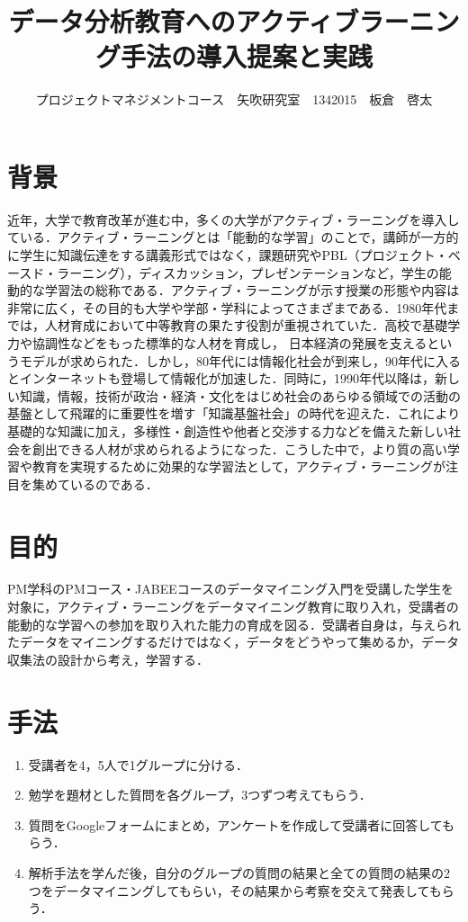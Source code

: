 \documentclass[uplatex,twocolumn,dvipdfmx]{jsarticle}
\title{\vspace{-5mm}\fontsize{14pt}{0pt}\selectfont  データ分析教育へのアクティブラーニング手法の導入提案と実践}
\author{\normalsize プロジェクトマネジメントコース　矢吹研究室　1342015　板倉　啓太}
\date{}
\begin{document}
\fontsize{10.5pt}{\baselineskip}\selectfont
\maketitle




\section{背景}

近年，大学で教育改革が進む中，多くの大学がアクティブ・ラーニングを導入している．アクティブ・ラーニングとは「能動的な学習」のことで，講師が一方的に学生に知識伝達をする講義形式ではなく，課題研究やPBL（プロジェクト・ベースド・ラーニング），ディスカッション，プレゼンテーションなど，学生の能動的な学習法の総称である．アクティブ・ラーニングが示す授業の形態や内容は非常に広く，その目的も大学や学部・学科によってさまざまである．1980年代までは，人材育成において中等教育の果たす役割が重視されていた．高校で基礎学力や協調性などをもった標準的な人材を育成し， 日本経済の発展を支えるというモデルが求められた．しかし，80年代には情報化社会が到来し，90年代に入るとインターネットも登場して情報化が加速した\cite{a}．同時に，1990年代以降は，新しい知識，情報，技術が政治・経済・文化をはじめ社会のあらゆる領域での活動の基盤として飛躍的に重要性を増す「知識基盤社会」の時代を迎えた．これにより基礎的な知識に加え，多様性・創造性や他者と交渉する力などを備えた新しい社会を創出できる人材が求められるようになった．こうした中で，より質の高い学習や教育を実現するために効果的な学習法として，アクティブ・ラーニングが注目を集めているのである．




\section{目的}

PM学科のPMコース・JABEEコースのデータマイニング入門を受講した学生を対象に，アクティブ・ラーニングをデータマイニング教育に取り入れ，受講者の能動的な学習への参加を取り入れた能力の育成を図る．受講者自身は，与えられたデータをマイニングするだけではなく，データをどうやって集めるか，データ収集法の設計から考え，学習する\cite{b}．



\section{手法}

\begin{enumerate}

\item 受講者を4，5人で1グループに分ける．
\item 勉学を題材とした質問を各グループ，3つずつ考えてもらう．
\item 質問をGoogleフォームにまとめ，アンケートを作成して受講者に回答してもらう．
\item 解析手法を学んだ後，自分のグループの質問の結果と全ての質問の結果の2つをデータマイニングしてもらい，その結果から考察を交えて発表してもらう．

\end{enumerate}
\end{document}
